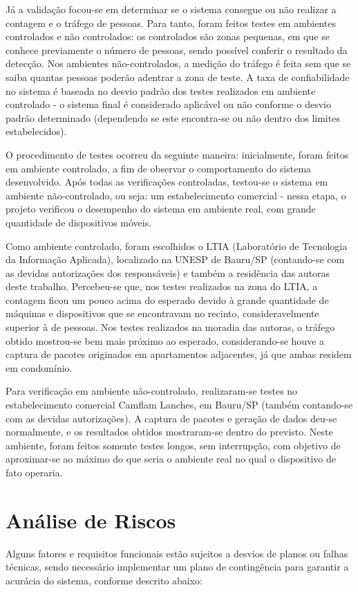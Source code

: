 Já a validação focou-se em determinar se o sistema consegue ou
não realizar a contagem e o tráfego de pessoas. Para tanto, foram feitos testes em
ambientes controlados e não controlados: os controlados são zonas pequenas, em que se conhece previamente o número de pessoas, sendo possível conferir o resultado da detecção. Nos ambientes não-controlados, a medição do tráfego é feita sem que se saiba quantas pessoas poderão adentrar a zona de teste. A taxa de confiabilidade no sistema é baseada no desvio padrão dos testes realizados em ambiente controlado - o sistema final é considerado aplicável ou não conforme o desvio padrão determinado (dependendo se este encontra-se ou não dentro dos limites estabelecidos).

O procedimento de testes ocorreu da seguinte maneira: inicialmente, foram feitos em ambiente controlado, a fim de observar o comportamento do sistema desenvolvido. Após todas as verificações controladas, testou-se o sistema em ambiente não-controlado, ou seja: um estabelecimento comercial - nessa etapa, o projeto verificou o desempenho do sistema em ambiente real, com grande quantidade de dispositivos móveis.

Como ambiente controlado, foram escolhidos o LTIA (Laboratório de Tecnologia da Informação Aplicada), localizado na UNESP de Bauru/SP (contando-se com as devidas autorizações dos responsáveis) e também a residência das autoras deste trabalho. Percebeu-se que, nos testes realizados na zona do LTIA, a contagem ficou um pouco acima do esperado devido à grande quantidade de máquinas e dispositivos que se encontravam no recinto, consideravelmente superior à de pessoas. Nos testes realizados na moradia das autoras, o tráfego obtido mostrou-se bem mais próximo ao esperado, considerando-se houve a captura de pacotes originados em  apartamentos adjacentes, já que ambas residem em condomínio.

Para verificação em ambiente não-controlado, realizaram-se testes no estabelecimento comercial Camflam Lanches, em Bauru/SP (também contando-se com as devidas autorizações). A captura de pacotes e geração de dados deu-se normalmente, e os resultados obtidos mostraram-se dentro do previsto. Neste ambiente, foram feitos somente testes longos, sem interrupção, com objetivo de aproximar-se ao máximo do que seria o ambiente real no qual o dispositivo de fato operaria.

\section{Análise de Riscos}
Alguns fatores e requisitos funcionais estão sujeitos a desvios de planos ou falhas técnicas, sendo necessário implementar um plano de contingência para garantir a acurácia do sistema, conforme descrito abaixo:

